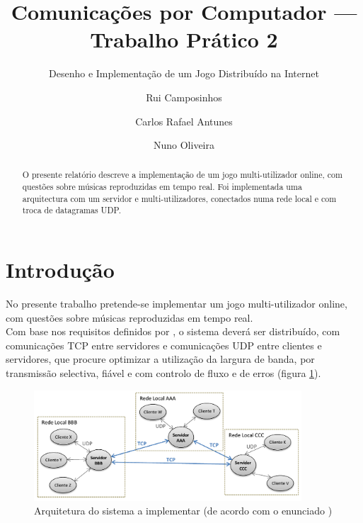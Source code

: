 \documentclass{llncs}
\begin{document}
\mainmatter
\title{Comunicações por Computador --- Trabalho Prático 2}
\subtitle{Desenho e Implementação de um Jogo Distribuído na Internet}
\author{Rui Camposinhos \and Carlos Rafael Antunes \and Nuno Oliveira}
\date{}
\maketitle

\begin{abstract}
O presente relatório descreve a implementação de um jogo multi-utilizador online, com 
questões sobre músicas reproduzidas em tempo real. Foi implementada uma arquitectura 
com um servidor e multi-utilizadores, conectados numa rede local e com troca de datagramas UDP.
\end{abstract}

\section{Introdução}
No presente trabalho pretende-se implementar um jogo multi-utilizador online, com 
questões sobre músicas reproduzidas em tempo real.\\

Com base nos requisitos definidos por \cite{enun}, o sistema deverá ser distribuído, 
com comunicações TCP entre servidores e comunicações UDP entre clientes e servidores, 
que procure optimizar a utilização da largura de banda, por transmissão selectiva, 
fiável e com controlo de fluxo e de erros (figura \ref{fig:arq}).

\begin{figure}
\begin{center}
\includegraphics[width=10cm]{arq.png} 
\end{center}
\caption{Arquitetura do sistema a implementar (de acordo com o enunciado \cite{enun})}
\label{fig:arq}
\end{figure} 
\end{document}
